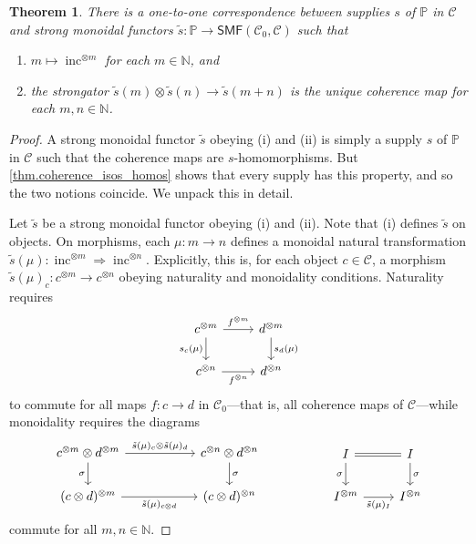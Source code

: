 \documentclass[11pt, oneside, article]{memoir}
\theoremstyle{plain}
\newtheorem{theorem}{Theorem}[chapter]
\theoremstyle{definition}
\theoremstyle{remark}
\newcommand{\cat}[1]{\mathcal{#1}}%
\newcommand{\Cat}[1]{{\mathsf{#1}}}%
\DeclareMathOperator{\inc}{inc}
\newcommand{\tpow}[1]{^{\otimes #1}}
\newcommand{\smf}{\Cat{SMF}}
\newcommand{\nn}{\mathbb{N}}
\newcommand{\pp}{\mathbb{P}}
\newcommand{\mob}[1]{#1_0}
\begin{document}
\begin{theorem}\label{thm.supply_v2}
There is a one-to-one correspondence between supplies $s$ of $\pp$ in $\cat{C}$ and strong monoidal functors $\tilde{s}\colon\pp\to\smf(\mob{\cat{C}},\cat{C})$ such that 
\begin{enumerate}[label=(\roman*)]
	\item $m\mapsto\inc\tpow{m}$ for each $m\in\nn$, and
	\item the strongator $\tilde{s}(m)\otimes \tilde{s}(n)\to \tilde{s}(m+n)$ is the unique coherence map for each $m,n \in \nn$.
\end{enumerate}
\end{theorem}\begin{proof}
A strong monoidal functor $\tilde{s}$ obeying (i) and (ii) is simply a supply $s$ of $\pp$ in $\cat{C}$ such that the coherence maps are $s$-homomorphisms. But \cref{thm.coherence_isos_homos} shows that every supply has this property, and so the two notions coincide. We unpack this in detail.

Let $\tilde{s}$ be a strong monoidal functor obeying (i) and (ii). Note that (i) defines $\tilde{s}$ on objects. On morphisms, each $\mu\colon m \to n$ defines a monoidal natural transformation $\tilde{s}(\mu)\colon \inc\tpow{m} \Rightarrow \inc\tpow{n}$. Explicitly, this is, for each object $c \in \cat{C}$, a morphism $\tilde{s}(\mu)_c \colon c\tpow{m} \to c \tpow{n}$ obeying naturality and monoidality conditions. Naturality requires 
\begin{equation}\label{eqn.C_0_homos}
\begin{tikzcd}
	c\tpow{m}\ar[d, "s_c(\mu)"']\ar[r, "f\tpow{m}"]&
	d\tpow{m}\ar[d, "s_d(\mu)"]\\
	c\tpow{n}\ar[r, "f\tpow{n}"']&
	d\tpow{n}
\end{tikzcd}
\end{equation}
to commute for all maps $f\colon c \to d$ in $\mob{\cat{C}}$---that is, all coherence maps of $\cat{C}$---while monoidality requires the diagrams
\begin{equation}\label{eqn.supply_commute_tensors_v2}
\begin{tikzcd}[column sep=55pt]
	c\tpow{m}\otimes d\tpow{m}\ar[r, "\tilde{s}(\mu)_c\otimes \tilde{s}(\mu)_d"]\ar[d, "\sigma"']&
	c\tpow{n}\otimes d\tpow{n}\ar[d, "\sigma"]\\
	(c\otimes d)\tpow{m}\ar[r, "\tilde{s}(\mu)_{c\otimes d}"']&
	(c\otimes d)\tpow{n}
\end{tikzcd}
\hspace{.7in}
\begin{tikzcd}
	I\ar[r, equal]\ar[d, "\sigma"']&
	I\ar[d, "\sigma"]\\
	I\tpow{m}\ar[r, "\tilde{s}(\mu)_I"']&
	I\tpow{n}
\end{tikzcd}
\end{equation}
commute for all $m,n \in \nn$.


\end{proof}
\end{document}
